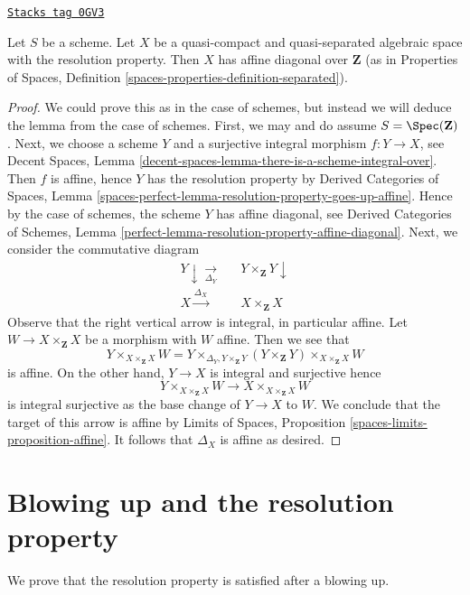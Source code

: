 \begin{lemma}
\label{spaces-more-morphisms-lemma-resolution-property-affine-diagonal}
\href{https://stacks.math.columbia.edu/tag/0GV3}{\texttt{Stacks tag 0GV3}}

Let $S$ be a scheme.
Let $X$ be a quasi-compact and quasi-separated algebraic space with
the resolution property. Then $X$ has affine diagonal over $\mathbf{Z}$
(as in Properties of Spaces, Definition
\ref{spaces-properties-definition-separated}).
\end{lemma}

\begin{proof}
We could prove this as in the case of schemes, but instead we will
deduce the lemma from the case of schemes.
First, we may and do assume $S = \Spec(\mathbf{Z})$.
Next, we choose a scheme $Y$ and a surjective integral morphism
$f : Y \to X$, see
Decent Spaces, Lemma \ref{decent-spaces-lemma-there-is-a-scheme-integral-over}.
Then $f$ is affine, hence $Y$ has the resolution property by
Derived Categories of Spaces, Lemma
\ref{spaces-perfect-lemma-resolution-property-goes-up-affine}.
Hence by the case of schemes, the scheme $Y$ has affine diagonal, see
Derived Categories of Schemes, Lemma
\ref{perfect-lemma-resolution-property-affine-diagonal}.
Next, we consider the commutative diagram
$$
\begin{array}{ccc}Y \downarrow\underset{\Delta_Y}{\longrightarrow} &  & Y \times_{\mathbf{Z}} Y \downarrow \\ X \overset{\Delta_X}{\longrightarrow} &  & X \times_{\mathbf{Z}} X\end{array}
$$
Observe that the right vertical arrow is integral, in particular
affine. Let $W \to X \times_{\mathbf{Z}} X$ be a morphism with $W$ affine.
Then we see that
$$
Y \times_{X \times_{\mathbf{Z}} X} W =
Y \times_{\Delta_Y, Y \times_{\mathbf{Z}} Y}
(Y \times_{\mathbf{Z}} Y) \times_{X \times_{\mathbf{Z}} X} W
$$
is affine. On the other hand, $Y \to X$ is integral and surjective
hence
$$
Y \times_{X \times_{\mathbf{Z}} X} W
\longrightarrow
X \times_{X \times_{\mathbf{Z}} X} W
$$
is integral surjective as the base change of $Y \to X$ to $W$.
We conclude that the target of this arrow is affine by
Limits of Spaces, Proposition \ref{spaces-limits-proposition-affine}.
It follows that $\Delta_X$ is affine as desired.
\end{proof}

\section{Blowing up and the resolution property}
\label{spaces-more-morphisms-section-resolution-property-by-blowing-up}
We prove that the resolution property is satisfied after a blowing up.

